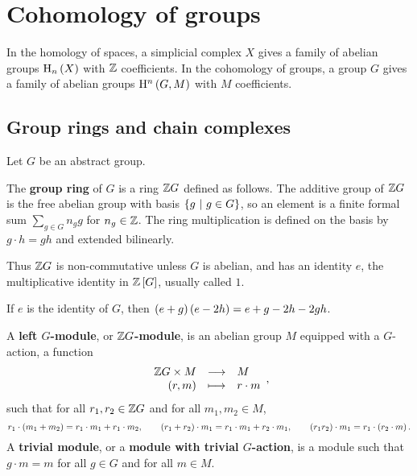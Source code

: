 \pagebreak

\section{Cohomology of groups}


In the homology of spaces, a simplicial complex $ X $ gives a family of abelian groups $ \H_n\br{X} $ with $ \mathbb{Z} $ coefficients. In the cohomology of groups, a group $ G $ gives a family of abelian groups $ \H^n\br{G, M} $ with $ M $ coefficients.

\subsection{Group rings and chain complexes}

Let $ G $ be an abstract group.

\begin{definition}
The \textbf{group ring} of $ G $ is a ring $ \mathbb{Z} G $ defined as follows. The additive group of $ \mathbb{Z} G $ is the free abelian group with basis $ \cbr{g \st g \in G} $, so an element is a finite formal sum $ \sum_{g \in G} n_gg $ for $ n_g \in \mathbb{Z} $. The ring multiplication is defined on the basis by $ g \cdot h = gh $ and extended bilinearly.
\end{definition}

Thus $ \mathbb{Z} G $ is non-commutative unless $ G $ is abelian, and has an identity $ e $, the multiplicative identity in $ \ZZ\sbr{G} $, usually called $ 1 $.

\begin{example}
If $ e $ is the identity of $ G $, then $ \br{e + g}\br{e - 2h} = e + g - 2h - 2gh $.
\end{example}

\begin{definition}
A \textbf{left $ G $-module}, or \textbf{$ \mathbb{Z} G $-module}, is an abelian group $ M $ equipped with a $ G $-action, a function
$$ \function{\ZZ G \times M}{M}{\br{r, m}}{r \cdot m}, $$
such that for all $ r_1, r_2 \in \mathbb{Z} G $ and for all $ m_1, m_2 \in M $,
$$ r_1 \cdot \br{m_1 + m_2} = r_1 \cdot m_1 + r_1 \cdot m_2, \qquad \br{r_1 + r_2} \cdot m_1 = r_1 \cdot m_1 + r_2 \cdot m_1, \qquad \br{r_1r_2} \cdot m_1 = r_1 \cdot \br{r_2 \cdot m}. $$
A \textbf{trivial module}, or a \textbf{module with trivial $ G $-action}, is a module such that $ g \cdot m = m $ for all $ g \in G $ and for all $ m \in M $.
\end{definition}


